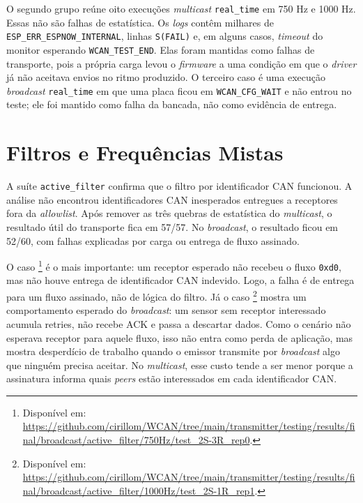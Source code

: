 O segundo grupo reúne oito execuções \emph{multicast} \texttt{real\_time} em 750 Hz e
1000 Hz. Essas não são falhas de estatística. Os \emph{logs} contêm milhares de
\texttt{ESP\_ERR\_ESPNOW\_INTERNAL}, linhas \texttt{S(FAIL)} e, em alguns casos,
\emph{timeout} do monitor esperando \texttt{WCAN\_TEST\_END}. Elas foram mantidas como
falhas de transporte, pois a própria carga levou o \emph{firmware} a uma condição em
que o \emph{driver} já não aceitava envios no ritmo produzido. O terceiro caso é uma
execução \emph{broadcast} \texttt{real\_time} em que uma placa ficou em
\texttt{WCAN\_CFG\_WAIT} e não entrou no teste; ele foi mantido como falha da
bancada, não como evidência de entrega.

\section{Filtros e Frequências Mistas}

A suíte \texttt{active\_filter} confirma que o filtro por identificador CAN funcionou. A
análise não encontrou identificadores CAN inesperados entregues a receptores fora da
\emph{allowlist}. Após remover as três quebras de estatística do \emph{multicast}, o
resultado útil do transporte fica em 57/57. No \emph{broadcast}, o resultado ficou em
52/60, com falhas explicadas por carga ou entrega de fluxo assinado.

O caso \footnote{Disponível em: \url{https://github.com/cirillom/WCAN/tree/main/transmitter/testing/results/final/broadcast/active_filter/750Hz/test_2S-3R_rep0}.} é o mais importante:
um receptor esperado não recebeu o fluxo \texttt{0xd0}, mas não houve entrega de
identificador CAN indevido. Logo, a falha é de entrega para um fluxo assinado, não de lógica
do filtro. Já o caso \footnote{Disponível em: \url{https://github.com/cirillom/WCAN/tree/main/transmitter/testing/results/final/broadcast/active_filter/1000Hz/test_2S-1R_rep1}.}
mostra um comportamento esperado do \emph{broadcast}: um sensor sem receptor interessado
acumula retries, não recebe ACK e passa a descartar dados. Como o cenário não
esperava receptor para aquele fluxo, isso não entra como perda de aplicação, mas
mostra desperdício de trabalho quando o emissor transmite por \emph{broadcast} algo que
ninguém precisa aceitar. No \emph{multicast}, esse custo tende a ser menor porque a
assinatura informa quais \emph{peers} estão interessados em cada identificador CAN.

